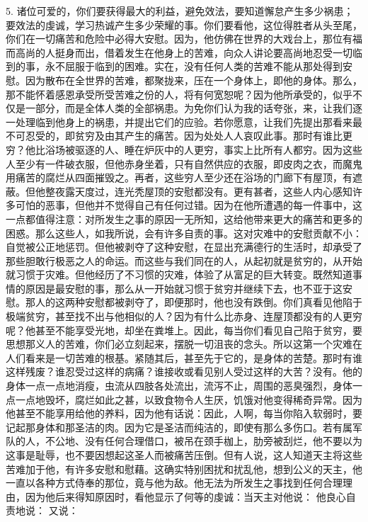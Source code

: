 5. 诸位可爱的，你们要获得最大的利益，避免效法，要知道懈怠产生多少祸患；要效法的虔诚，学习热诚产生多少荣耀的事。你们要看他，这位得胜者从头至尾，你们在一切痛苦和危险中必得大安慰。因为，他仿佛在世界的大戏台上，那位有福而高尚的人挺身而出，借着发生在他身上的苦难，向众人讲论要高尚地忍受一切临到的事，永不屈服于临到的困难。实在，没有任何人类的苦难不能从那处得到安慰。因为散布在全世界的苦难，都聚拢来，压在一个身体上，即他的身体。那么，那不能怀着感恩承受所受苦难之份的人，将有何宽恕呢？因为他所承受的，似乎不仅是一部分，而是全体人类的全部祸患。为免你们认为我的话夸张，来，让我们逐一处理临到他身上的祸患，并提出它们的应验。若你愿意，让我们先提出那看来最不可忍受的，即贫穷及由其产生的痛苦。因为处处人人哀叹此事。那时有谁比更穷？他比浴场被驱逐的人、睡在炉灰中的人更穷，事实上比所有人都穷。因为这些人至少有一件破衣服，但他赤身坐着，只有自然供应的衣服，即皮肉之衣，而魔鬼用痛苦的腐烂从四面摧毁之。再者，这些穷人至少还在浴场的门廊下有屋顶，有遮蔽。但他整夜露天度过，连光秃屋顶的安慰都没有。更有甚者，这些人内心感知许多可怕的恶事，但他并不觉得自己有任何过错。因为在他所遭遇的每一件事中，这一点都值得注意：对所发生之事的原因一无所知，这给他带来更大的痛苦和更多的困惑。那么这些人，如我所说，会有许多自责的事。这对灾难中的安慰贡献不小：自觉被公正地惩罚。但他被剥夺了这种安慰，在显出充满德行的生活时，却承受了那些胆敢行极恶之人的命运。而这些与我们同在的人，从起初就是贫穷的，从开始就习惯于灾难。但他经历了不习惯的灾难，体验了从富足的巨大转变。既然知道事情的原因是最安慰的事，那么从一开始就习惯于贫穷并继续下去，也不亚于这安慰。那人的这两种安慰都被剥夺了，即便那时，他也没有跌倒。你们真看见他陷于极端贫穷，甚至找不出与他相似的人？因为有什么比赤身、连屋顶都没有的人更穷呢？他甚至不能享受光地，却坐在粪堆上。因此，每当你们看见自己陷于贫穷，要思想那义人的苦难，你们必立刻起来，摆脱一切沮丧的念头。所以这第一个灾难在人们看来是一切苦难的根基。紧随其后，甚至先于它的，是身体的苦楚。那时有谁这样残废？谁忍受过这样的病痛？谁接收或看见别人受过这样的大苦？没有。他的身体一点一点地消瘦，虫流从四肢各处流出，流泻不止，周围的恶臭强烈，身体一点一点地毁坏，腐烂如此之甚，以致食物令人生厌，饥饿对他变得稀奇异常。因为他甚至不能享用给他的养料，因为他有话说：因此，人啊，每当你陷入软弱时，要记起那身体和那圣洁的肉。因为它是圣洁而纯洁的，即使有那么多伤口。若有属军队的人，不公地、没有任何合理借口，被吊在颈手枷上，肋旁被刮烂，他不要以为这事是耻辱，也不要因想起这圣人而被痛苦压倒。但有人说，这人知道天主将这些苦难加于他，有许多安慰和慰藉。这确实特别困扰和扰乱他，想到公义的天主，他一直以各种方式侍奉的那位，竟与他为敌。他无法为所发生之事找到任何合理理由，因为他后来得知原因时，看他显示了何等的虔诚：当天主对他说： 他良心自责地说： 又说：\par

